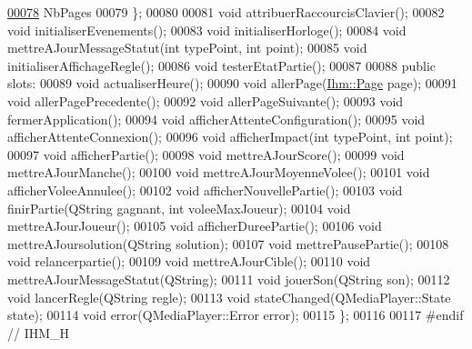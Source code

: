 \begin{DoxyCode}
\hyperlink{class_ihm_a472c7a7bec7e6e0230842f78ace4833ea9eb2cac6f79bce4cfd72383724004949}{00078}         NbPages
00079     \};
00080 
00081     \textcolor{keywordtype}{void} attribuerRaccourcisClavier();
00082     \textcolor{keywordtype}{void} initialiserEvenements();
00083     \textcolor{keywordtype}{void} initialiserHorloge();
00084     \textcolor{keywordtype}{void} mettreAJourMessageStatut(\textcolor{keywordtype}{int} typePoint, \textcolor{keywordtype}{int} point);
00085     \textcolor{keywordtype}{void} initialiserAffichageRegle();
00086     \textcolor{keywordtype}{void} testerEtatPartie();
00087 
00088 \textcolor{keyword}{public} slots:
00089     \textcolor{keywordtype}{void} actualiserHeure();
00090     \textcolor{keywordtype}{void} allerPage(\hyperlink{class_ihm_a472c7a7bec7e6e0230842f78ace4833e}{Ihm::Page} page);
00091     \textcolor{keywordtype}{void} allerPagePrecedente();
00092     \textcolor{keywordtype}{void} allerPageSuivante();
00093     \textcolor{keywordtype}{void} fermerApplication();
00094     \textcolor{keywordtype}{void} afficherAttenteConfiguration();
00095     \textcolor{keywordtype}{void} afficherAttenteConnexion();
00096     \textcolor{keywordtype}{void} afficherImpact(\textcolor{keywordtype}{int} typePoint, \textcolor{keywordtype}{int} point);
00097     \textcolor{keywordtype}{void} afficherPartie();
00098     \textcolor{keywordtype}{void} mettreAJourScore();
00099     \textcolor{keywordtype}{void} mettreAJourManche();
00100     \textcolor{keywordtype}{void} mettreAJourMoyenneVolee();
00101     \textcolor{keywordtype}{void} afficherVoleeAnnulee();
00102     \textcolor{keywordtype}{void} afficherNouvellePartie();
00103     \textcolor{keywordtype}{void} finirPartie(QString gagnant, \textcolor{keywordtype}{int} voleeMaxJoueur);
00104     \textcolor{keywordtype}{void} mettreAJourJoueur();
00105     \textcolor{keywordtype}{void} afficherDureePartie();
00106     \textcolor{keywordtype}{void} mettreAJoursolution(QString solution);
00107     \textcolor{keywordtype}{void} mettrePausePartie();
00108     \textcolor{keywordtype}{void} relancerpartie();
00109     \textcolor{keywordtype}{void} mettreAJourCible();
00110     \textcolor{keywordtype}{void} mettreAJourMessageStatut(QString);
00111     \textcolor{keywordtype}{void} jouerSon(QString son);
00112     \textcolor{keywordtype}{void} lancerRegle(QString regle);
00113     \textcolor{keywordtype}{void} stateChanged(QMediaPlayer::State state);
00114     \textcolor{keywordtype}{void} error(QMediaPlayer::Error error);
00115 \};
00116 
00117 \textcolor{preprocessor}{#endif // IHM\_H}
\end{DoxyCode}
